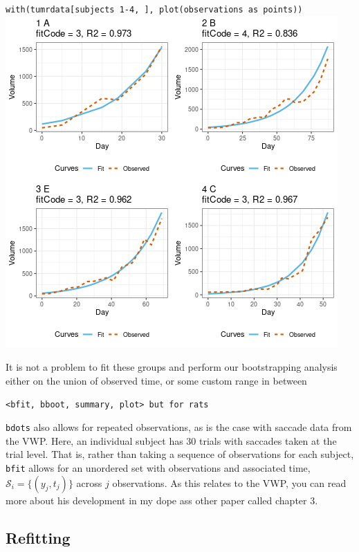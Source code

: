 \documentclass{article}
\begin{document}
\begin{center}
\texttt{with(tumrdata[subjects 1-4, ], plot(observations as points))}
\includegraphics[scale=0.5]{img/mouse.png}
\end{center}



It is not a problem to fit these groups and perform our bootstrapping analysis either on the union of observed time, or some custom range in between

\begin{center}
\texttt{<bfit, bboot, summary, plot> but for rats}
\end{center}

\texttt{bdots} also allows for repeated observations, as is the case with saccade data from the VWP. Here, an individual subject has 30 trials with saccades taken at the trial level. That is, rather than taking a sequence of observations for each subject, \texttt{bfit} allows for an unordered set with observations and associated time, $\mathcal{S}_i = \{(y_j, t_j)\}$ across $j$ observations. As this relates to the VWP, you can read more about his development in my dope ass other paper called chapter 3.


\subsection{Refitting}
\end{document}
